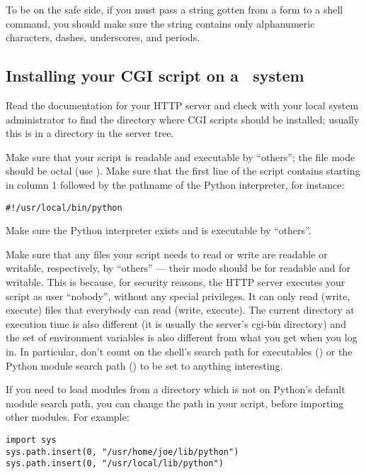 To be on the safe side, if you must pass a string gotten from a form
to a shell command, you should make sure the string contains only
alphanumeric characters, dashes, underscores, and periods.


\subsection{Installing your CGI script on a \UNIX\ system}

Read the documentation for your HTTP server and check with your local
system administrator to find the directory where CGI scripts should be
installed; usually this is in a directory  in the server tree.

Make sure that your script is readable and executable by ``others''; the
\UNIX{} file mode should be  octal (use ).  Make sure that the first line of the script contains
\code{\#!} starting in column 1 followed by the pathname of the Python
interpreter, for instance:

\begin{verbatim}
#!/usr/local/bin/python
\end{verbatim}

Make sure the Python interpreter exists and is executable by ``others''.

Make sure that any files your script needs to read or write are
readable or writable, respectively, by ``others'' --- their mode
should be  for readable and  for writable.  This
is because, for security reasons, the HTTP server executes your script
as user ``nobody'', without any special privileges.  It can only read
(write, execute) files that everybody can read (write, execute).  The
current directory at execution time is also different (it is usually
the server's cgi-bin directory) and the set of environment variables
is also different from what you get when you log in.  In particular, don't
count on the shell's search path for executables () or
the Python module search path () to be set to
anything interesting.

If you need to load modules from a directory which is not on Python's
default module search path, you can change the path in your script,
before importing other modules.  For example:

\begin{verbatim}
import sys
sys.path.insert(0, "/usr/home/joe/lib/python")
sys.path.insert(0, "/usr/local/lib/python")
\end{verbatim}

